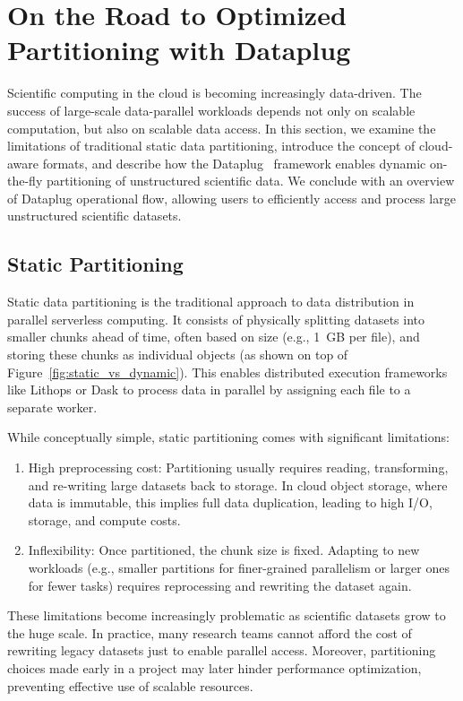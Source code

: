 \section{On the Road to Optimized Partitioning with Dataplug}

Scientific computing in the cloud is becoming increasingly data-driven. The success of large-scale data-parallel workloads depends not only on scalable computation, but also on scalable data access. In this section, we examine the limitations of traditional static data partitioning, introduce the concept of cloud-aware formats, and describe how the Dataplug~\citep{dataplug} framework enables dynamic on-the-fly partitioning of unstructured scientific data. We conclude with an overview of Dataplug operational flow, allowing users to efficiently access and process large unstructured scientific datasets.

\subsection{Static Partitioning}

Static data partitioning is the traditional approach to data distribution in parallel serverless computing. It consists of physically splitting datasets into smaller chunks ahead of time, often based on size (e.g., 1~GB per file), and storing these chunks as individual objects (as shown on top of Figure~\ref{fig:static_vs_dynamic}). This enables distributed execution frameworks like Lithops or Dask to process data in parallel by assigning each file to a separate worker.

While conceptually simple, static partitioning comes with significant limitations:

\begin{enumerate}
    \item High preprocessing cost: Partitioning usually requires reading, transforming, and re-writing large datasets back to storage. In cloud object storage, where data is immutable, this implies full data duplication, leading to high I/O, storage, and compute costs.
    \item Inflexibility: Once partitioned, the chunk size is fixed. Adapting to new workloads (e.g., smaller partitions for finer-grained parallelism or larger ones for fewer tasks) requires reprocessing and rewriting the dataset again.
\end{enumerate}

These limitations become increasingly problematic as scientific datasets grow to the huge scale. In practice, many research teams cannot afford the cost of rewriting legacy datasets just to enable parallel access. Moreover, partitioning choices made early in a project may later hinder performance optimization, preventing effective use of scalable resources.

